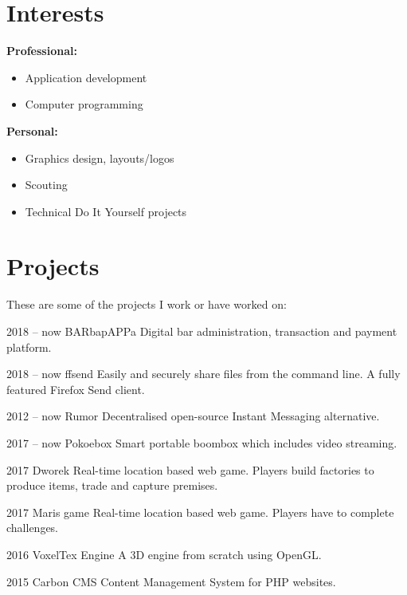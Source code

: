 \documentclass[]{friggeri-cv}
\providecommand{\tightlist}{%
\setlength{\itemsep}{0pt}\setlength{\parskip}{0pt}}
\begin{document}

\section{Interests}

\textbf{Professional:}
\begin{multicols}{2}
\begin{itemize}
  \tightlist{}
  \item Application development
  \item Computer programming
\end{itemize}
\end{multicols}


\textbf{Personal:}
\begin{multicols}{2}
\begin{itemize}
  \tightlist{}
  \item Graphics design, layouts/logos
  \item Scouting
  \item Technical Do It Yourself projects
\end{itemize}
\end{multicols}


\section{Projects}

These are some of the projects I work or have worked on:

\begin{entrylist}

\entry
{2018 -- now}
{BARbapAPPa}
{}
{Digital bar administration, transaction and payment platform.}

\entry
{2018 -- now}
{ffsend}
{}
{Easily and securely share files from the command line. A fully featured Firefox Send client.}

\entry
{2012 -- now}
{Rumor}
{}
{Decentralised open-source Instant Messaging alternative.}

\entry
{2017 -- now}
{Pokoebox}
{}
{Smart portable boombox which includes video streaming.}

\entry
{2017}
{Dworek}
{}
{Real-time location based web game. Players build factories to produce items,
trade and capture premises.}

\entry
{2017}
{Maris game}
{}
{Real-time location based web game. Players have to complete challenges.}

\entry
{2016}
{VoxelTex Engine}
{}
{A 3D engine from scratch using OpenGL.}

\entry
{2015}
{Carbon CMS}
{}
{Content Management System for PHP websites.}

\end{entrylist}
\end{document}
